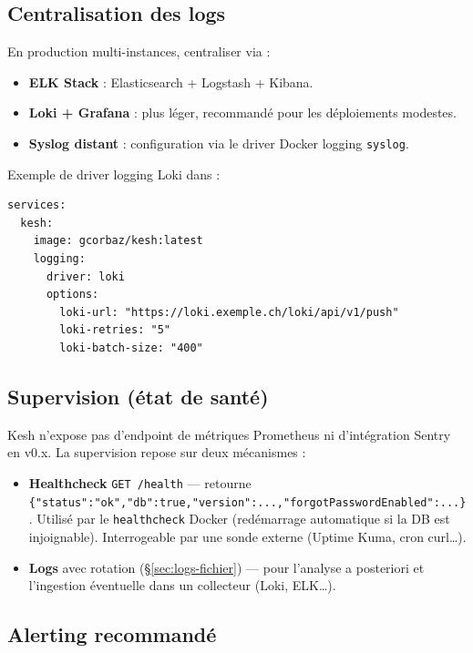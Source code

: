 \documentclass[a4paper,11pt,oneside]{article}
\begin{document}
\subsection{Centralisation des logs}

En production multi-instances, centraliser via :

\begin{itemize}
    \item \textbf{ELK Stack} : Elasticsearch + Logstash + Kibana.
    \item \textbf{Loki + Grafana} : plus léger, recommandé pour les déploiements modestes.
    \item \textbf{Syslog distant} : configuration via le driver Docker logging \texttt{syslog}.
\end{itemize}

Exemple de driver logging Loki dans  :

\begin{lstlisting}[]
services:
  kesh:
    image: gcorbaz/kesh:latest
    logging:
      driver: loki
      options:
        loki-url: "https://loki.exemple.ch/loki/api/v1/push"
        loki-retries: "5"
        loki-batch-size: "400"
\end{lstlisting}

\subsection{Supervision (état de santé)}

Kesh n'expose pas d'endpoint de métriques Prometheus ni d'intégration Sentry en
v0.x. La supervision repose sur deux mécanismes :

\begin{itemize}
    \item \textbf{Healthcheck} \texttt{GET /health} — retourne
    \texttt{\{"status":"ok","db":true,"version":...,"forgotPasswordEnabled":...\}}.
    Utilisé par le \texttt{healthcheck} Docker (redémarrage automatique si la DB
    est injoignable). Interrogeable par une sonde externe (Uptime Kuma, cron curl…).
    \item \textbf{Logs} avec rotation (\S\ref{sec:logs-fichier}) — pour l'analyse
    a posteriori et l'ingestion éventuelle dans un collecteur (Loki, ELK…).
\end{itemize}

\subsection{Alerting recommandé}
\end{document}
